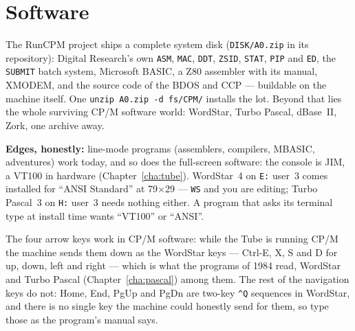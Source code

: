 \section{Software}
The RunCPM project ships a complete system disk
(\texttt{DISK/A0.zip} in its repository): Digital Research's own
\texttt{ASM}, \texttt{MAC}, \texttt{DDT}, \texttt{ZSID}, \texttt{STAT},
\texttt{PIP} and \texttt{ED}, the \texttt{SUBMIT} batch system, Microsoft
BASIC, a Z80 assembler with its manual, XMODEM, and the source code of the
BDOS and CCP --- buildable on the machine itself. One
\texttt{unzip A0.zip -d fs/CPM/} installs the lot. Beyond that lies the
whole surviving CP/M software world: WordStar, Turbo Pascal, dBase~II,
Zork, one archive away.

\begin{aside}
\textbf{Edges, honestly:} line-mode programs (assemblers, compilers,
MBASIC, adventures) work today, and so does the full-screen software:
the console is JIM, a VT100 in hardware (Chapter~\ref{cha:tube}).
WordStar~4 on \texttt{E:} user~3 comes installed for ``ANSI Standard''
at 79$\times$29 --- \verb|WS| and you are editing; Turbo Pascal~3 on
\texttt{H:} user~3 needs nothing either. A program that asks its
terminal type at install time wants ``VT100'' or ``ANSI''.

The four arrow keys work in CP/M software: while the Tube is running
CP/M the machine sends them down as the WordStar keys --- Ctrl-E, X, S
and D for up, down, left and right --- which is what the programs of 1984
read, WordStar and Turbo Pascal (Chapter~\ref{cha:pascal}) among them.
The rest of the navigation keys do not: Home, End, PgUp and PgDn are
two-key \texttt{\textasciicircum Q} sequences in WordStar, and there is
no single key the machine could honestly send for them, so type those as
the program's manual says.

\end{aside}

